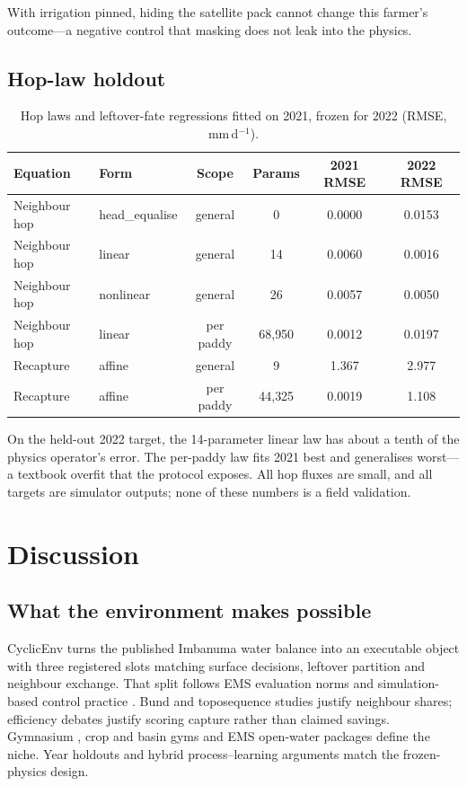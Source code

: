 \documentclass[preprint,12pt,authoryear,review]{elsarticle}
\begin{document}
With irrigation pinned, hiding the satellite pack cannot change this farmer's outcome---a negative control that masking does not leak into the physics.

\subsection{Hop-law holdout}

\begin{table}[htbp]
\centering
\footnotesize
\caption{Hop laws and leftover-fate regressions fitted on 2021, frozen for 2022 (RMSE, mm\,d$^{-1}$).}
\label{tab:hops}
\begin{tabular}{llcccc}
\toprule
Equation & Form & Scope & Params & 2021 RMSE & 2022 RMSE \\
\midrule
Neighbour hop & head\_equalise & general & 0 & 0.0000 & 0.0153 \\
Neighbour hop & linear & general & 14 & 0.0060 & 0.0016 \\
Neighbour hop & nonlinear & general & 26 & 0.0057 & 0.0050 \\
Neighbour hop & linear & per paddy & 68{,}950 & 0.0012 & 0.0197 \\
Recapture & affine & general & 9 & 1.367 & 2.977 \\
Recapture & affine & per paddy & 44{,}325 & 0.0019 & 1.108 \\
\bottomrule
\end{tabular}
\end{table}

On the held-out 2022 target, the 14-parameter linear law has about a tenth of the physics operator's error. The per-paddy law fits 2021 best and generalises worst---a textbook overfit that the protocol exposes. All hop fluxes are small, and all targets are simulator outputs; none of these numbers is a field validation.

\section{Discussion}
\label{sec:discussion}

\subsection{What the environment makes possible}

CyclicEnv turns the published Imbanuma water balance \citep{okura2025} into an executable object with three registered slots matching surface decisions, leftover partition and neighbour exchange. That split follows EMS evaluation norms \citep{jakeman2006,bennett2013} and simulation-based control practice \citep{giuliani2021}. Bund and toposequence studies \citep{janssen2009,tsubo2007} justify neighbour shares; efficiency debates \citep{perry2007,grafton2018} justify scoring capture rather than claimed savings. Gymnasium \citep{towers2024}, crop and basin gyms \citep{kelly2024,osika2026} and EMS open-water packages \citep{tomlinson2020,hamilton2024,raming2025} define the niche. Year holdouts \citep{gauch2021} and hybrid process--learning arguments \citep{reichstein2019,nearing2021} match the frozen-physics design.
\end{document}
